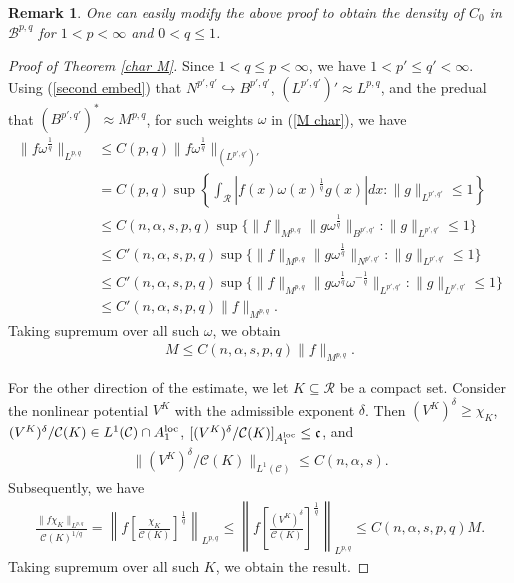 \documentclass[10pt,reqno]{amsart}
\newtheorem{remark}[theorem]{Remark}
\numberwithin{equation}{section}
\begin{document}
\begin{remark}
\rm One can easily modify the above proof to obtain the density of $C_{0}$ in $\mathcal{B}^{p,q}$ for $1<p<\infty$ and $0<q\leq 1$.  
\end{remark}

\begin{proof}[Proof of Theorem \ref{char M}]
Since $1<q\leq p<\infty$, we have $1<p'\leq q'<\infty$. Using (\ref{second embed}) that $N^{p',q'}\hookrightarrow B^{p',q'}$, $(L^{p',q'})'\approx L^{p,q}$, and the predual that $(B^{p',q'})^{\ast}\approx M^{p,q}$, for such weights $\omega$ in (\ref{M char}), we have
\begin{align*}
\|f\omega^{\frac{1}{q}}\|_{L^{p,q}}&\leq C(p,q)\|f\omega^{\frac{1}{q}}\|_{(L^{p',q'})'}\\
&=C(p,q)\sup\left\{\int_{\mathcal{R}}|f(x)\omega(x)^{\frac{1}{q}}g(x)|dx:\|g\|_{L^{p',q'}}\leq 1\right\}\\
&\leq C(n,\alpha,s,p,q)\sup\{\|f\|_{M^{p,q}}\|g\omega^{\frac{1}{q}}\|_{B^{p',q'}}:\|g\|_{L^{p',q'}}\leq 1\}\\
&\leq C'(n,\alpha,s,p,q)\sup\{\|f\|_{M^{p,q}}\|g\omega^{\frac{1}{q}}\|_{N^{p',q'}}:\|g\|_{L^{p',q'}}\leq 1\}\\
&\leq C'(n,\alpha,s,p,q)\sup\{\|f\|_{M^{p,q}}\|g\omega^{\frac{1}{q}}\omega^{-\frac{1}{q}}\|_{L^{p',q'}}:\|g\|_{L^{p',q'}}\leq 1\}\\
&\leq C'(n,\alpha,s,p,q)\|f\|_{M^{p,q}}.
\end{align*}
Taking supremum over all such $\omega$, we obtain 
\begin{align*}
M\leq C(n,\alpha,s,p,q)\|f\|_{M^{p,q}}.
\end{align*}

For the other direction of the estimate, we let $K\subseteq\mathcal{R}$ be a compact set. Consider the nonlinear potential $V^{K}$ with the admissible exponent $\delta$. Then $(V^{K})^{\delta}\geq\chi_{K}$, $(V^{K})^{\delta}/\mathcal{C}(K)\in L^{1}(\mathcal{C})\cap A_{1}^{\rm loc}$, $[(V^{K})^{\delta}/\mathcal{C}(K)]_{A_{1}^{\rm loc}}\leq\mathfrak{c}$, and 
\begin{align*}
\|(V^{K})^{\delta}/\mathcal{C}(K)\|_{L^{1}(\mathcal{C})}\leq C(n,\alpha,s).
\end{align*}
Subsequently, we have 
\begin{align*}
\frac{\|f\chi_{K}\|_{L^{p,q}}}{\mathcal{C}(K)^{1/q}}=\left\|f\left[\frac{\chi_{K}}{\mathcal{C}(K)}\right]^{\frac{1}{q}}\right\|_{L^{p,q}}\leq\left\|f\left[\frac{(V^{K})^{\delta}}{\mathcal{C}(K)}\right]^{\frac{1}{q}}\right\|_{L^{p,q}}\leq C(n,\alpha,s,p,q)M.
\end{align*}
Taking supremum over all such $K$, we obtain the result.
\end{proof}
\end{document}
